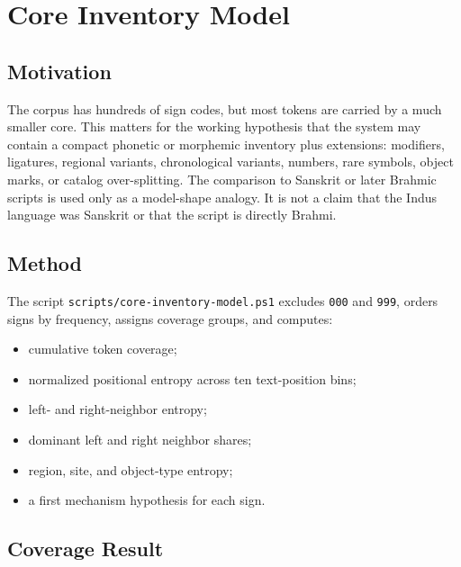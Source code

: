 \section{Core Inventory Model}

\subsection{Motivation}

The corpus has hundreds of sign codes, but most tokens are carried by a much smaller core. This matters for the working hypothesis that the system may contain a compact phonetic or morphemic inventory plus extensions: modifiers, ligatures, regional variants, chronological variants, numbers, rare symbols, object marks, or catalog over-splitting. The comparison to Sanskrit or later Brahmic scripts is used only as a model-shape analogy. It is not a claim that the Indus language was Sanskrit or that the script is directly Brahmi.

\subsection{Method}

The script \texttt{scripts/core-inventory-model.ps1} excludes \texttt{000} and \texttt{999}, orders signs by frequency, assigns coverage groups, and computes:

\begin{itemize}
  \item cumulative token coverage;
  \item normalized positional entropy across ten text-position bins;
  \item left- and right-neighbor entropy;
  \item dominant left and right neighbor shares;
  \item region, site, and object-type entropy;
  \item a first mechanism hypothesis for each sign.
\end{itemize}

\subsection{Coverage Result}

